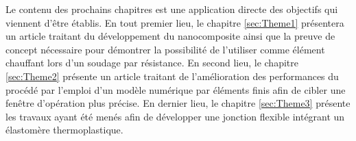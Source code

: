 Le contenu des prochains chapitres est une application directe des objectifs qui viennent d'être établis. 
En tout premier lieu, le chapitre \ref{sec:Theme1} présentera un article traitant du développement du nanocomposite ainsi que la preuve de concept nécessaire pour démontrer la possibilité de l'utiliser comme élément chauffant lors d'un soudage par résistance. 
En second lieu, le chapitre \ref{sec:Theme2} présente un article traitant de l'amélioration des performances du procédé par l'emploi d'un modèle numérique par éléments finis afin de cibler une fenêtre d'opération plus précise. 
En dernier lieu, le chapitre \ref{sec:Theme3} présente les travaux ayant été menés afin de développer une jonction flexible intégrant un élastomère thermoplastique. 